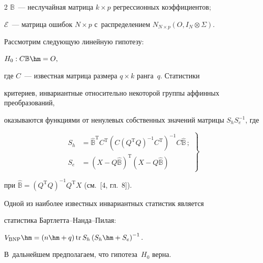 \begin{multicols}{2}
$\mathbb{B}$~---  неслучайная матрица $k \times p$ регрессионных коэффициентов;


$\mathcal{E}$~--- матрица ошибок  $N \times p$ с~распределением $N_{N\times 


p}\left(O,I_{N}\otimes\Sigma\right)$.





Рассмотрим следующую линейную гипотезу:


$


H_{0} : C\mathbb{B}\hm=O,


$


где $C$~--- известная матрица размера $q \times k$ ранга~$q$.  Статистики 


критериев, инвариантные относительно некоторой группы аффинных преобразований, 


оказываются функциями от ненулевых собственных значений матрицы $S_{h}S_{e}^{-1}$, где


\begin{equation}


\left.


\begin{array}{rl}


S_{h}&=\hat{\mathbb{B}}^{\mathrm{T}}C^{\mathrm{T}}\left(C\left(Q^{\mathrm{T}}Q\right) ^{-1}C^{\mathrm{T}}\right)^{-


1}C\hat{\mathbb{B}} \,;\\[6pt]


 S_{e}&=\left(X-Q\hat{\mathbb{B}}\right)^{\mathrm{T}}\left(X-


Q\hat{\mathbb{B}}\right)


\end{array}


\right\}


\label{S_h_and_S_e}


\end{equation}


при $\hat{\mathbb{B}}=\left(Q^{\mathrm{T}}Q\right)^{-1}Q^{\mathrm{T}}X$ (см.~[4, гл.~8]). 


Одной из наиболее известных инвариантных статистик является 


статистика Барт\-лет\-та--Нан\-да--Пи\-лая:


$


V_{\mathrm{BNP}}\hm=\left(n\hm+q\right)\mathrm{tr}\, S_{h}\left(S_{h}\hm+S_{e}\right)^{-1}.


$


В~дальнейшем предполагаем, что гипотеза~$H_0$ верна.






\end{multicols}

